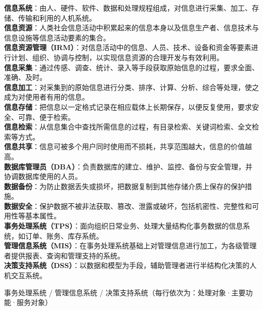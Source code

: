 \documentclass[a4paper,11pt]{article}
\begin{document}
\begin{keyterms}
\textbf{信息系统}：由人、硬件、软件、数据和处理规程组成，对信息进行采集、加工、存储、传输和利用的人机系统。\\
\textbf{信息资源}：人类社会信息活动中积累起来的信息本身以及信息生产者、信息技术与信息设施等信息活动要素的集合。\\
\textbf{信息资源管理（IRM）}：对信息活动中的信息、人员、技术、设备和资金等要素进行计划、组织、协调与控制，以实现信息资源的合理开发与有效利用。\\
\textbf{信息采集}：通过传感、调查、统计、录入等手段获取原始信息的过程，要求全面、准确、及时。\\
\textbf{信息加工}：对采集到的原始信息进行分类、排序、计算、分析、综合等处理，使之成为对使用者有用的信息。\\
\textbf{信息存储}：把信息以一定格式记录在相应载体上长期保存，以便反复使用，要求安全、可靠、便于检索。\\
\textbf{信息检索}：从信息集合中查找所需信息的过程，有目录检索、关键词检索、全文检索等方式。\\
\textbf{信息共享}：信息可被多个用户同时使用而不损耗，共享范围越大，信息的价值越高。\\
\textbf{数据库管理员（DBA）}：负责数据库的建立、维护、监控、备份与安全管理，并协调数据库使用的人员。\\
\textbf{数据备份}：为防止数据丢失或损坏，把数据复制到其他存储介质上保存的保护措施。\\
\textbf{数据安全}：保护数据不被非法获取、篡改、泄露或破坏，包括机密性、完整性和可用性等基本属性。\\
\textbf{事务处理系统（TPS）}：面向组织日常业务、处理大量结构化事务数据的信息系统，如订单、账务、库存系统。\\
\textbf{管理信息系统（MIS）}：在事务处理系统基础上对管理信息进行加工，为各级管理者提供报表、查询和管理支持的系统。\\
\textbf{决策支持系统（DSS）}：以数据和模型为手段，辅助管理者进行半结构化决策的人机交互系统。
\end{keyterms}

\begin{contrast}{事务处理系统 / 管理信息系统 / 决策支持系统（每行依次为：处理对象·主要功能·服务对象）}
\end{contrast}
\end{document}
